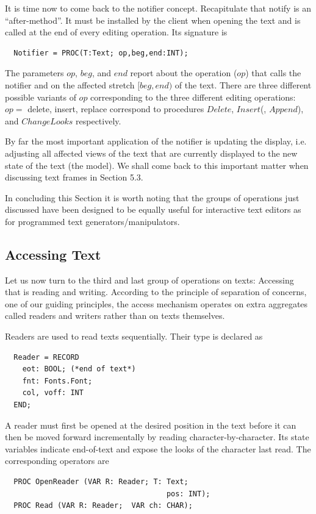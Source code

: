 It is time now to come back to the notifier concept. Recapitulate that notify is an “after-method”. It
must be installed by the client when opening the text and is called at the end of every editing
operation. Its signature is
\begin{verbatim}
  Notifier = PROC(T:Text; op,beg,end:INT);
\end{verbatim}
The parameters $op$, $beg$, and $end$ report about the operation ($op$) that calls the notifier and on the
affected stretch $[beg, end)$ of the text. There are three different possible variants of $op$
corresponding to the three different editing operations: $op =$ delete, insert, replace correspond to
procedures $Delete$, $Insert$(, $Append$), and $ChangeLooks$ respectively.

By far the most important application of the notifier is updating the display, i.e. adjusting all affected
views of the text that are currently displayed to the new state of the text (the model). We shall come
back to this important matter when discussing text frames in Section 5.3.

In concluding this Section it is worth noting that the groups of operations just discussed have been
designed to be equally useful for interactive text editors as for programmed text generators/manipulators.

\subsection{Accessing Text}
Let us now turn to the third and last group of operations on texts: Accessing that is reading and
writing. According to the principle of separation of concerns, one of our guiding principles, the
access mechanism operates on extra aggregates called readers and writers rather than on texts
themselves.

Readers are used to read texts sequentially. Their type is declared as
\begin{verbatim}
  Reader = RECORD
    eot: BOOL; (*end of text*)
    fnt: Fonts.Font;
    col, voff: INT
  END;
\end{verbatim}

A reader must first be opened at the desired position in the text before it can then be moved
forward incrementally by reading character-by-character. Its state variables indicate end-of-text and
expose the looks of the character last read.
The corresponding operators are
\begin{verbatim}
  PROC OpenReader (VAR R: Reader; T: Text;
                                     pos: INT);
  PROC Read (VAR R: Reader;  VAR ch: CHAR);
\end{verbatim}


